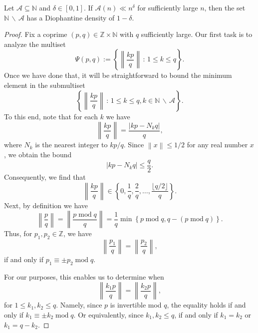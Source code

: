 \documentclass[10pt,a4paper]{amsart}
\newcommand{\dnint}[1]{\left\|{#1}\right\|}
\renewcommand{\mod}{\;\mathrm{mod}\;}
\begin{document}
\begin{theorem}\label{thm:set_diff_ddense}
Let $\mathcal{A} \subseteq \mathbb{N}$ and $\delta \in [0,1]$. If $\mathcal{A}(n) \ll n^{\delta}$ for sufficiently large $n$, then the set $\mathbb{N} \,\backslash \,\mathcal{A}$ has a Diophantine density of $1-\delta$.
\end{theorem}

\begin{proof}
Fix a coprime $(p,q) \in \mathbb{Z} \times \mathbb{N}$ with $q$ sufficiently large.  Our first task is to analyze the multiset
\begin{equation*}
    \Psi(p,q):= \left\{\dnint{\frac{k p}{q}}\,:\,  1 \leq k \leq q \right\}.
\end{equation*}
Once we have done that, it will be straightforward to bound the minimum element in the submultiset
\begin{equation*}
    \left\{\dnint{\frac{k p}{q}}\,:\,  1 \leq k \leq q, k \in \mathbb{N}\,\backslash\,\mathcal{A} \right\}.
\end{equation*}
To this end, note that for each $k$ we have
\begin{equation*}
\dnint{\frac{kp}{q}} = \frac{\left\vert{kp-N_{k}q}\right\vert}{q},
\end{equation*}
where $N_{k}$ is the nearest integer to $kp/q$.  Since $\dnint{x} \leq 1/2$ for any real number $x$, we obtain the bound
\begin{equation*}
\vert{k p -  N_{k} q }\vert \leq \frac{q}{2}.
\end{equation*}
Consequently, we find that
\begin{equation*}
\dnint{\frac{kp}{q}} \in \left\{0,\frac{1}{q},\frac{2}{q},\dots,\frac{\lfloor{q/2}\rfloor}{q}\right\}.
\end{equation*}
Next, by definition we have
\begin{equation*}
    \dnint{\frac{p}{q}} = \dnint{\frac{p \mod q}{q}} = \frac{1}{q}\min\left\{p \mod q, q - (p \mod q)\right\}.
\end{equation*}
Thus, for $p_{1},p_{2} \in \mathbb{Z}$, we have
\begin{equation*}
    \dnint{\frac{p_{1}}{q}} = \dnint{\frac{p_{2}}{q}},
\end{equation*}
if and only if $p_{1} \equiv \pm p_{2} \mod q$.

For our purposes, this enables us to determine when
\begin{equation*}
    \dnint{\frac{k_{1} p}{q}} = \dnint{\frac{k_{2} p}{q}},
\end{equation*}
for $1\leq k_{1},k_{2}\leq q$.  Namely, since $p$ is invertible mod $q$, the equality holds if and only if $k_{1} \equiv \pm k_{2} \mod q$.  Or equivalently, since $k_{1},k_{2} \leq q$, if and only if $k_{1} = k_{2}$ or $k_{1} = q-k_{2}$.


\end{proof}
\end{document}
